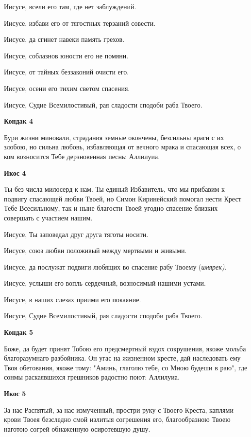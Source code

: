 Иисусе, всели его там, где нет заблуждений. 

Иисусе, избави его от тягостных терзаний совести. 

Иисусе, да сгинет навеки память грехов. 

Иисусе, соблазнов юности его не помяни. 

Иисусе, от тайных беззаконий очисти его. 

Иисусе, осени его тихим светом спасения. 

Иисусе, Судие Всемилостивый, рая сладости сподоби раба Твоего.


\medskip


\bfseries Кондак 4\normalfont{}


Бури жизни миновали, страдания земные окончены, безсильны враги с их злобою, но сильна любовь, избавляющая от вечного мрака и спасающая всех, о ком возносится Тебе дерзновенная песнь: Аллилуиа.


\medskip


\bfseries Икос 4\normalfont{}


Ты без числа милосерд к нам. Ты единый Избавитель, что мы прибавим к подвигу спасающей любви Твоей, но Симон Киринейский помогал нести Крест Тебе Всесильному, так и ныне благости Твоей угодно спасение близких совершать с участием нашим. 

Иисусе, Ты заповедал друг друга тяготы носити. 

Иисусе, союз любви положивый между мертвыми и живыми. 

Иисусе, да послужат подвиги любящих во спасение рабу Твоему (\itshape имярек\normalfont{}). 

Иисусе, услыши его вопль сердечный, возносимый нашими устами. 

Иисусе, в наших слезах приими его покаяние. 

Иисусе, Судие Всемилостивый, рая сладости сподоби раба Твоего.


\medskip


\bfseries Кондак 5\normalfont{}


Боже, да будет принят Тобою его предсмертный вздох сокрушения, якоже мольба благоразумнаго разбойника. Он угас на жизненном кресте, дай наследовать ему Твоя обетования, якоже тому: "Аминь, глаголю тебе, со Мною будеши в раю", где сонмы раскаявшихся грешников радостно поют: Аллилуиа.


\medskip


\bfseries Икос 5\normalfont{}


За нас Распятый, за нас измученный, простри руку с Твоего Креста, каплями крови Твоея безследно смой излитыя согрешения его, благообразною Твоею наготою согрей обнаженную осиротевшую душу. 


